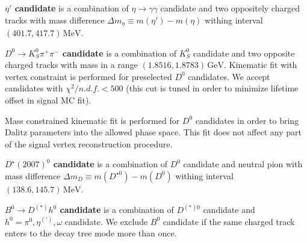 \documentclass[preprint,aps,showpacs]{revtex4}
\newcommand{\dst}{\ensuremath{D^{\star}(2007)^0}\xspace}
\newcommand{\etagg}{\ensuremath{\eta\to\gamma\gamma}\xspace}
\newcommand{\etappp}{\ensuremath{\eta\to\pi^+\pi^-\pi^0}\xspace}
\newcommand{\de}{\ensuremath{\Delta E}\xspace}
\newcommand{\mbc}{\ensuremath{M_{bc}}\xspace}
\begin{document}
{\bf \boldmath$\eta\prime$ candidate} is a combination of \etagg candidate and two oppositely charged tracks with mass difference $\Delta m_{\eta} \equiv m(\eta\prime)-m(\eta)$ withing interval $(401.7,417.7)\,\text{MeV}$.%



{\bf \boldmath$D^0\to K_S^0\pi^+\pi^-$ candidate} is a combination of $K_S^0$ candidate and two opposite charged tracks with mass in a range $\left(1.8516,1.8783\right)\,\text{GeV}$. Kinematic fit with vertex constraint is performed for preselected $D^0$ candidates. We accept candidates with $\chi^2/n.d.f.<500$ (this cut is tuned in order to minimize lifetime offset in signal MC fit). %

Mass constrained kinematic fit is performed for $D^0$ candidates in order to
bring Dalitz parameters into the allowed phase space. This fit does not affect any part of the signal vertex reconstruction procedure.


{\bf \boldmath\dst candidate} is a combination of $D^0$ candidate and neutral pion with mass difference $\Delta m_{D} \equiv m(D^{\star0})-m(D^0)$ withing interval $(138.6,145.7)\,\text{MeV}$.

{\bf \boldmath$B^0\to D^{(*)}h^0$ candidate} is a combination of $D^{(*)0}$ candidate and $h^0=\pi^0,\eta^{(\prime)},\omega$ candidate. We exclude $B^0$ candidate if the same charged track enters to the decay tree mode more than once.
\end{document}
